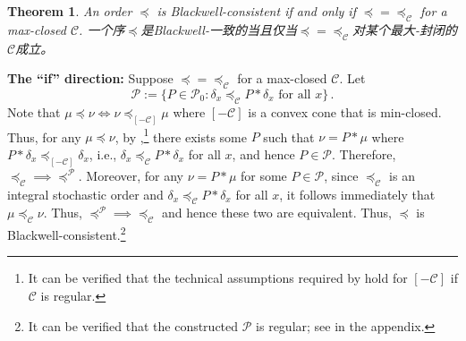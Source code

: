 \documentclass[12pt,letterpaper]{article}
\makeatletter
\newenvironment{original}{\color{black}}{}
\newenvironment{translation}{\color{blue}}{}
\theoremstyle{plain}
\newtheorem{theorem}{Theorem}
\theoremstyle{definition}
\renewenvironment{proof}[1][\proofname]{
  \par\pushQED{\qed}\normalfont
  \topsep6\p@\@plus6\p@\relax
  \trivlist\item[\hskip\labelsep\bfseries#1\@addpunct{.}]
  \ignorespaces
}{
  \popQED\endtrivlist\@endpefalse
}
\theoremstyle{remark}
\newcommand{\Pc}{\mathcal{P}}
\newcommand{\C}{\mathcal{C}}
\theoremstyle{definition}
\makeatother
\begin{document}
\begin{theorem}\label{thm:main2}
\begin{original}
An order $\preceq$ is Blackwell-consistent if and only if $\preceq = \preceq_\C$ for a max-closed $\C$.
\end{original}
\begin{translation}
一个序$\preceq$是Blackwell-一致的当且仅当$\preceq = \preceq_\C$对某个最大-封闭的$\C$成立。
\end{translation}
\end{theorem}
\begin{proof}[Proof of \Cref{thm:main2}]
\begin{original}
\textbf{The ``if'' direction:} Suppose $\preceq = \preceq_\C$ for a max-closed $\C$. Let
\[\Pc := \Big\{P \in \Pc_0: \delta_x \preceq_\C  P *\delta_x \text{ for all $x$} \Big\}\,.\]
Note that $\mu\preceq \nu \iff \nu \preceq_{[-\C]} \mu$ where $[-\C]$ is a convex cone that is min-closed. Thus, for any $\mu\preceq \nu$, by ,\footnote{It can be verified that the technical assumptions required by  hold for $[-\C]$ if $\C$ is regular.}  there exists some $P$ such that $\nu = P * \mu$ where $P * \delta_x  \preceq_{[-\C]} \delta_x$, i.e., $\delta_x \preceq_{\C} P * \delta_x$ for all $x$, and hence $P \in \Pc$.  Therefore, $\preceq_\C \implies \preceq^\Pc$. Moreover, for any $\nu = P * \mu$ for some $P \in \Pc$, since $\preceq_\C$ is an integral stochastic order and $\delta_x \preceq_\C P * \delta_x$ for all $x$, it follows immediately that $\mu \preceq_\C \nu$. Thus, $\preceq^\Pc \implies \preceq_\C$ and hence these two are equivalent. Thus, $\preceq$ is Blackwell-consistent.\footnote{It can be verified that the constructed $\Pc$ is regular; see  in the appendix.}


\end{original}
\end{proof}
\end{document}
